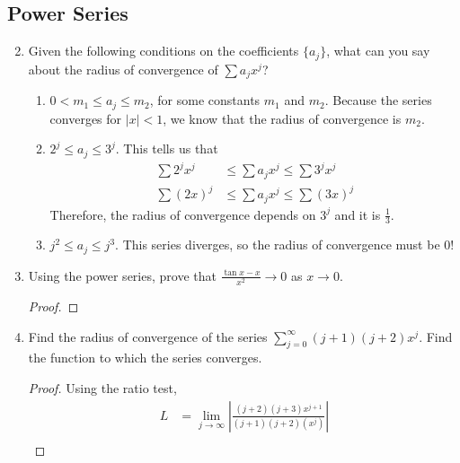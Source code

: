 \documentclass{article}
\begin{document}
\subsection{Power Series}

\begin{enumerate}
      \setcounter{enumi}{1}
      \item Given the following conditions on the coefficients $\{a_j\}$, what
            can you say about the radius of convergence of $\sum a_jx^j$?
            \begin{enumerate}
                  \item $0<m_1\leq a_j\leq m_2$, for some constants $m_1$ and $m_2$.
                        \medbreak
                        Because the series converges for $|x|<1$, we know that the radius
                        of convergence is $m_2$.
                  \item $2^j\leq a_j\leq 3^j$.
                        \medbreak
                        This tells us that
                        \begin{align*}
                              \sum 2^jx^j & \leq \sum a_jx^j \leq \sum 3^jx^j \\
                              \sum (2x)^j & \leq \sum a_jx^j \leq \sum (3x)^j
                        \end{align*}
                        Therefore, the radius of convergence depends on $3^j$
                        and it is $\frac{1}{3}$.
                  \item $j^2\leq a_j\leq j^3$.
                        \medbreak
                        This series diverges, so the radius of convergence must be 0!
            \end{enumerate}
            \setcounter{enumi}{5}
      \item Using the power series, prove that
            $\frac{\tan x-x}{x^2}\to 0$ as $x\to 0$.
            \begin{proof}
            \end{proof}
            \setcounter{enumi}{10}
      \item Find the radius of convergence of the series
            $\sum_{j=0}^\infty(j+1)(j+2)x^j$. Find the function to which
            the series converges.
            \begin{proof}
                  Using the ratio test,
                  \begin{align*}
                        L & = \lim_{j\to\infty}\left|\frac{(j+2)(j+3)x^{j+1}}{(j+1)(j+2)(x^j)}\right| \\

\end{align*}
\end{proof}
\end{enumerate}
\end{document}
